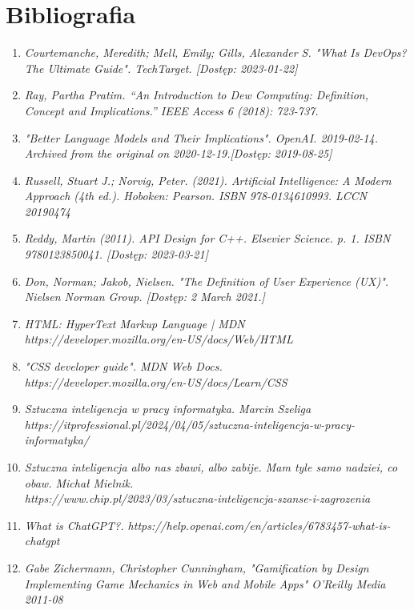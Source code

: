 \section{Bibliografia}

\begin{enumerate}

\item {\textit {Courtemanche, Meredith; Mell, Emily; Gills, Alexander S. "What Is DevOps? The Ultimate Guide". TechTarget. [Dostęp: 2023-01-22]}}
\item {\textit {Ray, Partha Pratim. “An Introduction to Dew Computing: Definition, Concept and Implications.” IEEE Access 6 (2018): 723-737.}}

\item {\textit {"Better Language Models and Their Implications". OpenAI. 2019-02-14. Archived from the original on 2020-12-19.[Dostęp: 2019-08-25]}}
\item {\textit {Russell, Stuart J.; Norvig, Peter. (2021). Artificial Intelligence: A Modern Approach (4th ed.). Hoboken: Pearson. ISBN 978-0134610993. LCCN 20190474}}
\item {\textit {Reddy, Martin (2011). API Design for C++. Elsevier Science. p. 1. ISBN 9780123850041. [Dostęp: 2023-03-21]}}
\item {\textit {Don, Norman; Jakob, Nielsen. "The Definition of User Experience (UX)". Nielsen Norman Group. [Dostęp: 2 March 2021.]}}
\item {\textit {HTML: HyperText Markup Language | MDN \\ https://developer.mozilla.org/en-US/docs/Web/HTML}}
\item {\textit {"CSS developer guide". MDN Web Docs. \\ https://developer.mozilla.org/en-US/docs/Learn/CSS}}
\item {\textit {Sztuczna inteligencja w pracy informatyka. Marcin Szeliga \\ https://itprofessional.pl/2024/04/05/sztuczna-inteligencja-w-pracy-informatyka/}}
\item {\textit {Sztuczna inteligencja albo nas zbawi, albo zabije. Mam tyle samo nadziei, co obaw. Michał Mielnik. \\ https://www.chip.pl/2023/03/sztuczna-inteligencja-szanse-i-zagrozenia}}
\item {\textit {What is ChatGPT?. https://help.openai.com/en/articles/6783457-what-is-chatgpt}}
\item {\textit {Gabe Zichermann, Christopher Cunningham, "Gamification by Design Implementing Game Mechanics in Web and Mobile Apps" O'Reilly Media 2011-08}}

\end{enumerate}
